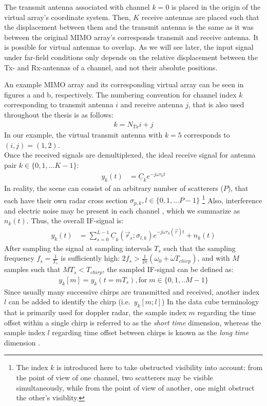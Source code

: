 The transmit antenna associated with channel $k=0$ is placed in the origin of the virtual array's coordinate system.
Then, $K$ receive antennas are placed such that the displacement between them and the transmit antenna
is the same as it was between the original MIMO array's corresponds transmit and receive antenna.
It is possible for virtual antennas to overlap.
As we will see later, the input signal under far-field conditions only depends
on the relative displacement between the Tx- and Rx-antennas of a channel, and not their absolute positions.

An example MIMO array and its corresponding virtual array can be seen in figures a and b, respectively.
The numbering convention for channel index $k$ corresponding to transmit antenna $i$ and receive antenna $j$,
that is also used throughout the thesis is as follows:
\begin{align}
    k = N_{Tx}i + j
\end{align}
In our example, the virtual transmit antenna with $k=5$ corresponds to $(i,j)=(1,2)$. \\

Once the received signals are demultiplexed, the ideal receive signal for antenna pair $k \in \{0,1,...K-1\}$:
\begin{align}
    y_k(t) & = \underline C_k e^{-j\dot\omega\tau_k t} \label{eqn:ideal_scatterer}
\end{align}
In reality, the scene can consist of an arbitrary number of scatterers ($P$),
that each have their own radar cross section $\sigma_{p,k}, l \in \{0,1,...P-1\}$
\footnote{
    The index $k$ is introduced here to take obstructed visibility into account:
    from the point of view of one channel, two scatterers may be visible simultaneously,
    while from the point of view of another, one might obstruct the other's visiblity.
}
Also, interference and electric noise may be present in each channel \parencite[see][ch. 4]{jankiraman},
which we summarize as $n_k(t)$. Thus, the overall IF-signal is:
\begin{align}
    y_k(t) & = \sum_{s=0}^{L-1} \underline C_k(\vec r_s; \sigma_{l,k}) e^{-j\dot\omega\tau_k(\vec r)t} + n_k(t)
\end{align}
After sampling the signal at sampling intervals $T_s$ such that the sampling frequency $f_s = \frac{1}{T_s}$
is sufficiently high: ${2f_s > \frac{1}{2\pi}(\omega_0 + \dot \omega T_{chirp})}$, and with $M$ samples such that $MT_s < T_{chirp}$,
the sampled IF-signal can be defined as:
\begin{align}
    y_k[m] = y_k(t=mT_s), \text{for}\;m \in \{0,1,..M-1\}
\end{align}
Since usually many successive chirps are transmitted and received,
another index $l$ can be added to identify the chirp (i.e.\ $y_{k}[m;l]$)
In the data cube terminology that is primarily used for doppler radar,
the sample index $m$ regarding the time offset within a single chirp 
is referred to as the \emph{short time} dimension,
whereas the sample index $l$ regarding time offset between chirps
is known as the \emph{long time} dimension \parencite[see][pp. 290f.]{richards}.



